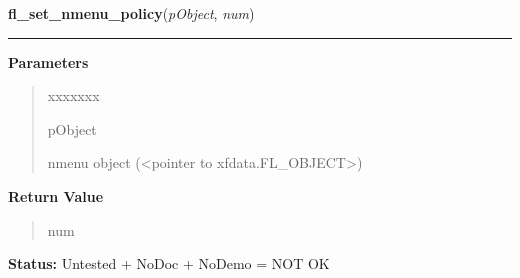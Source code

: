 \hspace{.8\funcindent}\begin{boxedminipage}{\funcwidth}

    \raggedright \textbf{fl\_set\_nmenu\_policy}(\textit{pObject}, \textit{num})

    \vspace{-1.5ex}

    \rule{\textwidth}{0.5\fboxrule}
\setlength{\parskip}{2ex}
\setlength{\parskip}{1ex}
      \textbf{Parameters}
      \vspace{-1ex}

      \begin{quote}
        \begin{Ventry}{xxxxxxx}

          \item[pObject]

          nmenu object ({\textless}pointer to 
          xfdata.FL\_OBJECT{\textgreater})

        \end{Ventry}

      \end{quote}

      \textbf{Return Value}
    \vspace{-1ex}

      \begin{quote}
      num

      \end{quote}

\textbf{Status:} Untested + NoDoc + NoDemo = NOT OK



    \end{boxedminipage}

    \label{xformslib:library:fl_set_nmenu_hl_text_color}

    \vspace{0.5ex}

